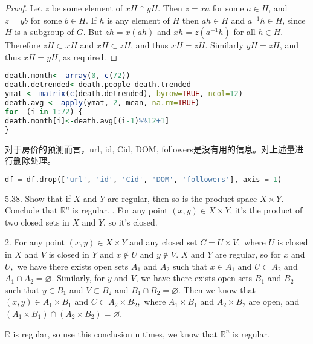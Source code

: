 \documentclass[12pt]{article}
\begin{document}
\begin{homeworkProblem}
\begin{proof}
Let $z$ be some element of $xH \cap yH$.  Then $z = xa$ for some $a \in H$, and $z = yb$ for some $b \in H$. If $h$ is any element of $H$ then $ah \in H$ and $a^{-1}h \in H$, since $H$ is a subgroup of $G$. But $zh = x(ah)$ and $xh = z(a^{-1}h)$ for all $h \in H$. Therefore $zH \subset xH$ and $xH \subset zH$, and thus $xH = zH$.  Similarly $yH = zH$, and thus $xH = yH$, as required.
\end{proof}

\lstset{numbers=left, xleftmargin=1.5em,xrightmargin=0.5em, aboveskip=0.5em}
\begin{lstlisting}[language=R]
death.month<- array(0, c(72))
death.detrended<-death.people-death.trended
ymat <- matrix(c(death.detrended), byrow=TRUE, ncol=12)
death.avg <- apply(ymat, 2, mean, na.rm=TRUE)
for  (i in 1:72) {
death.month[i]<-death.avg[(i-1)%%12+1]
}
\end{lstlisting}

对于房价的预测而言，url, id, Cid, DOM, followers是没有用的信息。对上述量进行删除处理。
\lstset{numbers=left, xleftmargin=1.5em,xrightmargin=0.5em, aboveskip=0.5em}
\begin{lstlisting}[language=python]
df = df.drop(['url', 'id', 'Cid', 'DOM', 'followers'], axis = 1)
\end{lstlisting}

%
\end{homeworkProblem}
\pagebreak
  
\begin{homeworkProblem}
5.38. Show that if $X$ and $Y$ are regular, then so is the product space $X \times Y .$ Conclude that $\mathbb{R}^{n}$ is regular.
. For any point $(x, y) \in X \times Y$, it's the product of two closed sets in $X$ and $Y$, so it's closed. 

2. For any point $(x, y) \in X \times Y$ and any closed set $C=U \times V,$ where $U$ is closed in $X$ and $V$ is closed in $Y$ and $x \notin U$ and $y \notin V$. $X$ and $Y$ are regular, so for $x$ and $U,$ we have there exists open sets $A_{1}$ and $A_{2}$ such that $x \in A_{1}$ and $U \subset A_{2}$ and $A_{1} \cap A_{2}=\varnothing$. Similarly, for $y$ and $V$, we have there exists open sets $B_{1}$ and $B_{2}$ such that $y \in B_{1}$ and $V \subset B_{2}$ and $B_{1} \cap B_{2}=\varnothing$.
Then we know that $(x, y) \in A_{1} \times B_{1}$ and $C \subset A_{2} \times B_{2},$ where $A_{1} \times B_{1}$ and $A_{2} \times B_{2}$ are open, and $\left(A_{1} \times B_{1}\right) \cap\left(A_{2} \times B_{2}\right)=\varnothing$.

$\mathbb{R}$ is regular, so use this conclusion n times, we know that $\mathbb{R}^{n}$ is regular.
\end{homeworkProblem}
\pagebreak
\end{document}
